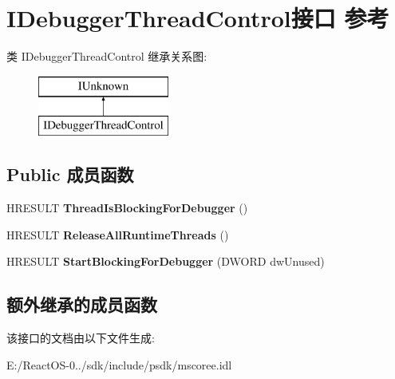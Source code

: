 \hypertarget{interface_i_debugger_thread_control}{}\section{I\+Debugger\+Thread\+Control接口 参考}
\label{interface_i_debugger_thread_control}
类 I\+Debugger\+Thread\+Control 继承关系图\+:\begin{figure}[H]
\begin{center}
\leavevmode
\includegraphics[height=2.000000cm]{interface_i_debugger_thread_control}
\end{center}
\end{figure}
\subsection*{Public 成员函数}
\begin{DoxyCompactItemize}
\item 
\mbox{\label{interface_i_debugger_thread_control_a7a14d38c75e615992f24e967a56eb067}} 
H\+R\+E\+S\+U\+LT {\bfseries Thread\+Is\+Blocking\+For\+Debugger} ()
\item 
\mbox{\label{interface_i_debugger_thread_control_aa3987a7e977ca5e7d5e126f12471bec4}} 
H\+R\+E\+S\+U\+LT {\bfseries Release\+All\+Runtime\+Threads} ()
\item 
\mbox{\label{interface_i_debugger_thread_control_ab0c3f3d8cf46cf6dc89c3f1e81830f35}} 
H\+R\+E\+S\+U\+LT {\bfseries Start\+Blocking\+For\+Debugger} (D\+W\+O\+RD dw\+Unused)
\end{DoxyCompactItemize}
\subsection*{额外继承的成员函数}


该接口的文档由以下文件生成\+:\begin{DoxyCompactItemize}
\item 
E\+:/\+React\+O\+S-\/0../sdk/include/psdk/mscoree.\+idl\end{DoxyCompactItemize}
